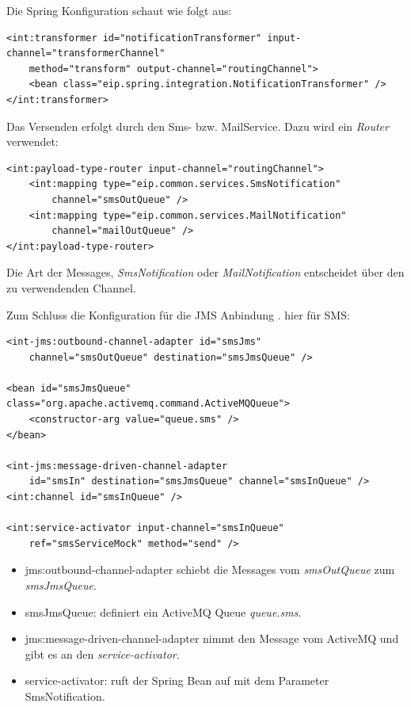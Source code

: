 \documentclass[12pt,a4paper,ngerman]{article}
\begin{document}
Die Spring Konfiguration schaut wie folgt aus:

\begin{lstlisting}
<int:transformer id="notificationTransformer" input-channel="transformerChannel"
    method="transform" output-channel="routingChannel">
    <bean class="eip.spring.integration.NotificationTransformer" />
</int:transformer>
\end{lstlisting}

Das Versenden erfolgt durch den Sms- bzw. MailService. Dazu wird ein
\emph{Router} verwendet:

\begin{lstlisting}
<int:payload-type-router input-channel="routingChannel">
    <int:mapping type="eip.common.services.SmsNotification"
        channel="smsOutQueue" />
    <int:mapping type="eip.common.services.MailNotification"
        channel="mailOutQueue" />
</int:payload-type-router>
\end{lstlisting}

Die Art der Messages, \emph{SmsNotification} oder
\emph{MailNotification} entscheidet über den zu verwendenden Channel.

Zum Schluss die Konfiguration für die JMS Anbindung . hier für SMS:

\begin{lstlisting}
<int-jms:outbound-channel-adapter id="smsJms"
    channel="smsOutQueue" destination="smsJmsQueue" />

<bean id="smsJmsQueue" class="org.apache.activemq.command.ActiveMQQueue">
    <constructor-arg value="queue.sms" />
</bean>

<int-jms:message-driven-channel-adapter
    id="smsIn" destination="smsJmsQueue" channel="smsInQueue" />
<int:channel id="smsInQueue" />

<int:service-activator input-channel="smsInQueue"
    ref="smsServiceMock" method="send" />
\end{lstlisting}

\begin{itemize}
\item
  jms:outbound-channel-adapter schiebt die Messages vom
  \emph{smsOutQueue} zum \emph{smsJmsQueue}.
\item
  smsJmsQueue: definiert ein ActiveMQ Queue \emph{queue.sms}.
\item
  jms:message-driven-channel-adapter nimmt den Message vom ActiveMQ und
  gibt es an den \emph{service-activator}.
\item
  service-activator: ruft der Spring Bean auf mit dem Parameter
  SmsNotification.
\end{itemize}
\end{document}
